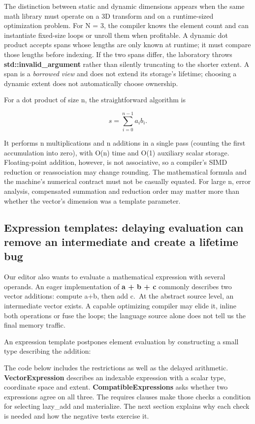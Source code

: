 The distinction between static and dynamic dimensions appears when the same math library must operate on a 3D transform and on a runtime-sized optimization problem. For N = 3, the compiler knows the element count and can instantiate fixed-size loops or unroll them when profitable. A dynamic dot product accepts spans whose lengths are only known at runtime; it must compare those lengths before indexing. If the two spans differ, the laboratory throws \textbf{std::invalid\_argument} rather than silently truncating to the shorter extent. A span is a \emph{borrowed view} and does not extend its storage's lifetime; choosing a dynamic extent does not automatically choose ownership.

For a dot product of size n, the straightforward algorithm is

\[
s=\sum_{i=0}^{n-1}a_i b_i.
\]

It performs n multiplications and n additions in a single pass (counting the first accumulation into zero), with O(n) time and O(1) auxiliary scalar storage. Floating-point addition, however, is not associative, so a compiler's SIMD reduction or reassociation may change rounding. The mathematical formula and the machine's numerical contract must not be casually equated. For large n, error analysis, compensated summation and reduction order may matter more than whether the vector's dimension was a template parameter.

\subsection{Expression templates: delaying evaluation can remove an intermediate and create a lifetime bug}\label{05-engine-i-ch007-expression-templates-delaying-evaluation-can-remove-an-intermediate-and-create-a-lifetime-bug}

Our editor also wants to evaluate a mathematical expression with several operands. An eager implementation of \textbf{a + b + c} commonly describes two vector additions: compute a+b, then add c.~At the abstract source level, an intermediate vector exists. A capable optimizing compiler may elide it, inline both operations or fuse the loops; the language source alone does not tell us the final memory traffic.

An expression template postpones element evaluation by constructing a small type describing the addition:

The code below includes the restrictions as well as the delayed arithmetic. \textbf{VectorExpression} describes an indexable expression with a scalar type, coordinate space and extent. \textbf{CompatibleExpressions} asks whether two expressions agree on all three. The requires clauses make those checks a condition for selecting lazy\_add and materialize. The next section explains why each check is needed and how the negative tests exercise it.

